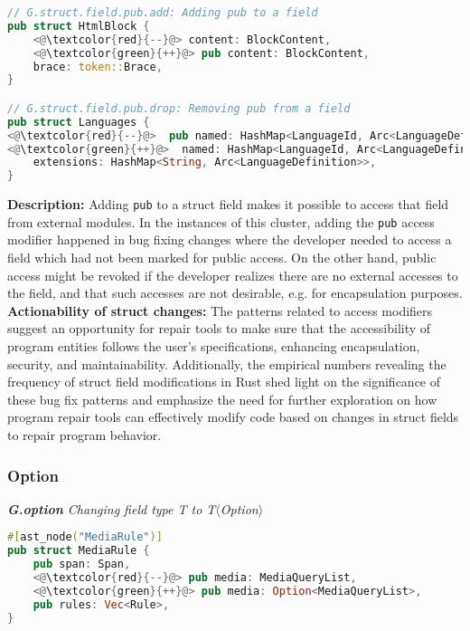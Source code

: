 \begin{lstlisting}[language=Rust, style=colouredRust]
// G.struct.field.pub.add: Adding pub to a field
pub struct HtmlBlock {
    <@\textcolor{red}{--}@> content: BlockContent,
    <@\textcolor{green}{++}@> pub content: BlockContent,
    brace: token::Brace,
} 

// G.struct.field.pub.drop: Removing pub from a field
pub struct Languages {
<@\textcolor{red}{--}@>  pub named: HashMap<LanguageId, Arc<LanguageDefinition>>,
<@\textcolor{green}{++}@>  named: HashMap<LanguageId, Arc<LanguageDefinition>>,
    extensions: HashMap<String, Arc<LanguageDefinition>>,
}

\end{lstlisting}

\noindent\textbf{Description:} Adding \texttt{pub} to a struct field makes it possible to access that field from external modules. In the instances of this cluster, adding the \texttt{pub} access modifier happened in bug fixing changes where the developer needed to access a field which had not been marked for public access. On the other hand, public access might be revoked if the developer realizes there are no external accesses to the field, and that such accesses are not desirable, e.g. for encapsulation purposes. \\

\noindent\textbf{Actionability of struct changes:} The patterns related to access modifiers suggest an opportunity for repair tools to make sure that the accessibility of program entities follows the user's specifications, enhancing encapsulation, security, and maintainability. Additionally, the empirical numbers revealing the frequency of struct field modifications in Rust shed light on the significance of these bug fix patterns and emphasize the need for further exploration on how program repair tools can effectively modify code based on changes in struct fields to repair program behavior. 

\subsubsection{Option}
\vspace{3mm}

\noindent\textit{\textbf{G.option} Changing field type T to T$\langle$Option$\rangle$}

\begin{lstlisting}[language=Rust, style=colouredRust]
#[ast_node("MediaRule")]
pub struct MediaRule {
    pub span: Span,
    <@\textcolor{red}{--}@> pub media: MediaQueryList,
    <@\textcolor{green}{++}@> pub media: Option<MediaQueryList>,
    pub rules: Vec<Rule>,
}

\end{lstlisting}

